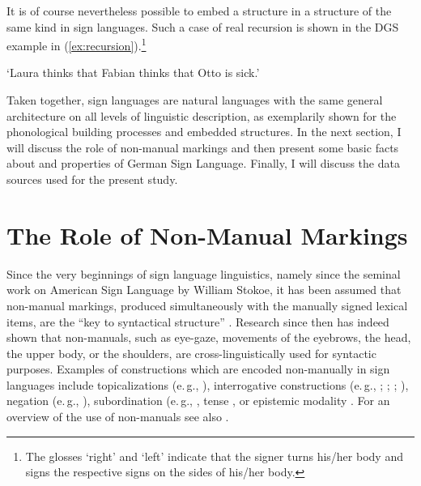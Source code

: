 \noindent It is of course nevertheless possible to embed a structure in a structure of the same kind in sign languages. Such a case of real recursion is shown in the DGS example in (\ref{ex:recursion}).\footnote{ The glosses `right' and `left' indicate that the signer turns his/her body and signs the respective signs on the sides of his/her body.}

\begin{exe}
\ex {}  
\glt `Laura thinks that Fabian thinks that Otto is sick.' \label{ex:recursion}
\end{exe} 

\noindent Taken together, sign languages are natural languages with the same general architecture on all levels of linguistic description, as exemplarily shown for the phonological building processes and embedded structures. In the next section, I will discuss the role of non-manual markings and then present some basic facts about and properties of German Sign Language. Finally, I will discuss the data sources used for the present study.

\section{The Role of Non-Manual Markings}\label{sectionnmms}
Since the very beginnings of sign language linguistics, namely since the seminal work on American Sign Language by William Stokoe, it has been assumed that non-manual markings, produced simultaneously with the manually signed lexical items, are the ``key to syntactical structure'' \citep[63]{stokoe1960sign}. Research since then has indeed shown that non-manuals, such as eye-gaze, movements of the eyebrows, the head, the upper body, or the shoulders, are cross-linguistically used for syntactic purposes. Examples of constructions which are encoded non-manually in sign languages include topicalizations (e.\,g., \citealt{aarons1994aspects, aarons1996topics,brunelli2011antisymmetry}), interrogative constructions (e.\,g., \citealt{neidle2000syntax}; \citealt{zeshan2004interrogative}; \citealt{zeshan2006negative}; \citealt{brunelli2011antisymmetry}), negation (e.\,g., \citealt{pfau2002applying, roland2002v, zeshan2004negation, zeshan2006negative}), subordination (e.\,g., \citealt{wilbur1999syntactic, pfau2005relative, cecchetto2006strategies, branchini2009relatively}, tense \citep{zucchi2009along}, or epistemic modality \citep{bross2017scope}. For an overview of the use of non-manuals see also \citet{pfauquer2010nonmanuals}.

